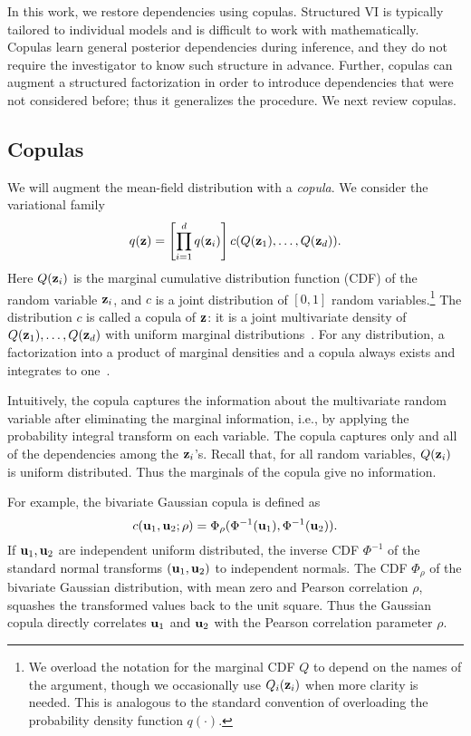 In this work, we restore dependencies using copulas. Structured
\gls{VI} is typically tailored to individual models and is difficult
to work with mathematically. Copulas learn general posterior
dependencies during inference, and they do not require the
investigator to know such structure in advance. Further, copulas can
augment a structured factorization in order to introduce
dependencies that were not considered before; thus it generalizes
the procedure. We next review copulas.

\subsection{Copulas}
\label{subsec:copulas}

We will augment the mean-field distribution with a \emph{copula}. We
consider the variational family
\begin{equation*}
  q(\boldsymbol{\mathbf{z}}) = \left[\prod_{i=1}^d q(\boldsymbol{\mathbf{z}}_i)\right] c(Q(\boldsymbol{\mathbf{z}}_1),\ldots,Q(\boldsymbol{\mathbf{z}}_d)).
\end{equation*}
Here $Q(\boldsymbol{\mathbf{z}}_i)$ is the marginal cumulative distribution function (CDF)
of the random variable $\boldsymbol{\mathbf{z}}_i$, and $c$ is a joint distribution of
$[0,1]$ random variables.\footnote{We overload the notation for the
  marginal CDF $Q$ to depend on the names of the argument, though we
  occasionally use $Q_i(\boldsymbol{\mathbf{z}}_i)$ when more clarity is needed. This is
  analogous to the standard convention of overloading the probability
  density function $q(\cdot)$.}  The distribution $c$ is called
a copula of $\boldsymbol{\mathbf{z}}$: it is a joint multivariate density of
$Q(\boldsymbol{\mathbf{z}}_1),\ldots,Q(\boldsymbol{\mathbf{z}}_d)$ with uniform marginal
distributions~\citep{sklar1959fonstions}.  For any distribution, a
factorization into a product of marginal densities and a copula always
exists and integrates to one~\citep{nelsen2006introduction}.

Intuitively, the copula captures the information about the
multivariate random variable after eliminating the marginal
information, i.e., by applying the probability integral transform on
each variable. The copula captures only and all of the dependencies
among the $\boldsymbol{\mathbf{z}}_i$'s. Recall that, for all random variables, $Q(\boldsymbol{\mathbf{z}}_i)$ is
uniform distributed. Thus the marginals of the copula give no
information.

For example, the bivariate Gaussian copula is defined as
\begin{equation*}
  c(\boldsymbol{\mathbf{u}}_1, \boldsymbol{\mathbf{u}}_2; \rho)= \Phi_\rho(\Phi^{-1}(\boldsymbol{\mathbf{u}}_1),
  \Phi^{-1}(\boldsymbol{\mathbf{u}}_2)).
\end{equation*}
If $\boldsymbol{\mathbf{u}}_1,\boldsymbol{\mathbf{u}}_2$ are independent uniform distributed, the inverse CDF
$\Phi^{-1}$ of the standard normal transforms $(\boldsymbol{\mathbf{u}}_1,\boldsymbol{\mathbf{u}}_2)$ to independent
normals. The CDF $\Phi_{\rho}$ of the bivariate Gaussian
distribution, with mean zero and Pearson correlation $\rho$, squashes the
transformed values back to the unit square.
Thus the Gaussian copula directly correlates $\boldsymbol{\mathbf{u}}_1$ and $\boldsymbol{\mathbf{u}}_2$
with the Pearson correlation parameter $\rho$.

